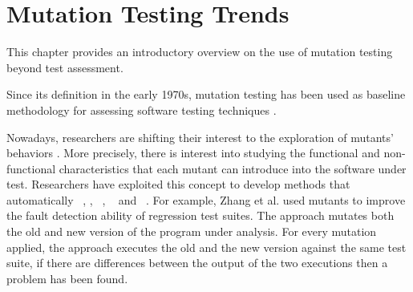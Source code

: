 
\chapter{Mutation Testing Trends}
\label{chapter:trends}



This chapter provides an introductory overview on the use of mutation testing beyond test assessment.

Since its definition in the early 1970s, mutation testing has been used 
as baseline methodology for assessing software testing techniques \cite{chekam2017empirical}.


Nowadays, researchers are shifting their interest to the exploration of mutants' behaviors \cite{papadakis2019mutation}. 
More precisely, there is interest into studying the functional and non-functional characteristics that each mutant can introduce into the software under test.
Researchers have exploited this concept to develop methods that automatically ~\cite{zhang2016isomorphic},  \cite{papadakis2015metallaxis}, ~\cite{le2011genprog}, ~\cite{loise2017towards} and ~\cite{langdon2017genetic}.
For example, Zhang et al. \cite{zhang2016isomorphic} used mutants to improve the fault detection ability of regression test suites. The approach mutates both the old and new version of the program under analysis. For every mutation applied, the approach executes the old and the new version against the same test suite, if there are differences between the output of the two executions then a problem has been found.

